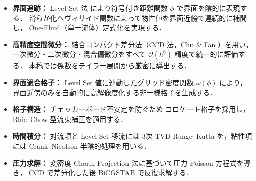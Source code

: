 \documentclass[12pt, a4paper, titlepage]{article}
\newcommand{\jp}[1]{{\normalfont\jpfont #1}}
\newcommand{\Ord}[1]{\mathcal{O}(#1)}
\begin{document}
\begin{itemize}
  \item \jp{\textbf{界面追跡：} Level Set 法 \cite{Sussman1994}
        により符号付き距離関数 $\phi$ で界面を陰的に表現する．
        滑らか化ヘヴィサイド関数によって物性値を界面近傍で連続的に補間し，
        One-Fluid（単一流体）定式化を実現する．}
  \item \jp{\textbf{高精度空間微分：} 結合コンパクト差分法（CCD 法，Chu \& Fan \cite{ChuFan1998}）を用い，
        一次微分・二次微分・混合偏微分をすべて $\Ord{h^6}$ 精度で統一的に評価する．
        本稿では係数をテイラー展開から厳密に導出する．}
  \item \jp{\textbf{界面適合格子：} Level Set 値に連動したグリッド密度関数 $\omega(\phi)$ により，
        界面近傍のみを自動的に高解像度化する非一様格子を生成する．}
  \item \jp{\textbf{格子構造：} チェッカーボード不安定を防ぐため
        コロケート格子を採用し，Rhie--Chow 型流束補正を適用する．}
  \item \jp{\textbf{時間積分：} 対流項と Level Set 移流には
        3次 TVD Runge--Kutta を，粘性項には Crank--Nicolson 半陰的処理を用いる．}
  \item \jp{\textbf{圧力求解：} 変密度 Chorin Projection 法に基づいて圧力 Poisson 方程式を導き，
        CCD で差分化した後 BiCGSTAB で反復求解する．}
\end{itemize}
\end{document}
